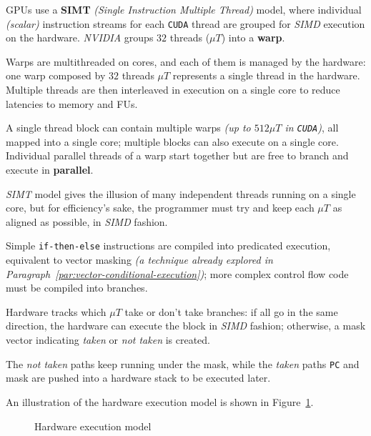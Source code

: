 \documentclass[english]{article}
\begin{document}
\bigskip
GPUs use a \textbf{SIMT} \textit{(Single Instruction Multiple Thread)} model, where individual \textit{(scalar)} instruction streams for each \texttt{CUDA} thread are grouped for \textit{SIMD} execution on the hardware.
\textit{NVIDIA} groups \(32\) threads (\(\mu T\)) into a \textbf{warp}.

Warps are multithreaded on cores, and each of them is managed by the hardware:
one warp composed by \(32\) threads \textit{\(\mu T\)} represents a single thread in the hardware.
Multiple threads are then interleaved in execution on a single core to reduce latencies to memory and FUs.

A single thread block can contain multiple warps \textit{(up to \(512 \mu T\) in \texttt{CUDA})}, all mapped into a single core;
multiple blocks can also execute on a single core.
Individual parallel threads of a warp start together but are free to branch and execute in \textbf{parallel}.

\textit{SIMT} model gives the illusion of many independent threads running on a single core, but for efficiency's sake, the programmer must try and keep each \(\mu T\) as aligned as possible, in \textit{SIMD} fashion.

\bigskip
Simple \texttt{if-then-else} instructions are compiled into predicated execution, equivalent to vector masking \textit{(a technique already explored in Paragraph~\ref{par:vector-conditional-execution})};
more complex control flow code must be compiled into branches.

Hardware tracks which \(\mu T\) take or don't take branches:
if all go in the same direction, the hardware can execute the block in \textit{SIMD} fashion;
otherwise, a mask vector indicating \textit{taken} or \textit{not taken} is created.

The \textit{not taken} paths keep running under the mask, while the \textit{taken} paths \texttt{PC} and mask are pushed into a hardware stack to be executed later.

\bigskip
An illustration of the hardware execution model is shown in Figure~\ref{fig:gpu-hardware-model}.

\begin{figure}[htbp]
  \bigskip
  \centering
  \caption{Hardware execution model}
  \label{fig:gpu-hardware-model}
  \bigskip
\end{figure}
\end{document}
